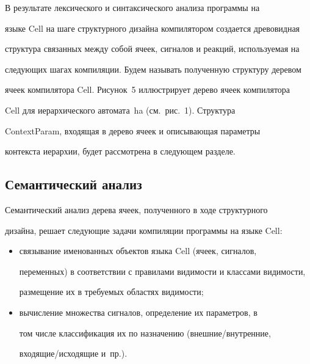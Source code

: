       


      В результате лексического и синтаксического анализа программы на 


языке Cell на шаге структурного дизайна компилятором создается древовидная 


структура связанных между собой ячеек, сигналов и реакций, используемая на 


следующих шагах компиляции. Будем называть полученную структуру деревом 


ячеек компилятора Cell. Рисунок~5 иллюстрирует дерево ячеек компилятора 


Cell для иерархического автомата~ha (см.\ рис.~1). Структура 


ContextParam, входящая в дерево ячеек и описывающая параметры 


контекста иерархии, будет рассмотрена в следующем разделе.





      


\subsection{Семантический анализ}





      Семантический анализ дерева ячеек, полученного в ходе структурного 


дизайна, решает следующие задачи компиляции программы на языке Cell:


      \begin{itemize}


      \item связывание именованных объектов языка Cell (ячеек, сигналов, 


переменных) в соответствии с правилами видимости и классами видимости, 


размещение их в требуемых областях видимости;


      \item вычисление множества сигналов, определение их параметров, в 


том чис\-ле классификация их по назначению (внешние/внутренние, 


входящие/исходящие и~пр.).


      \end{itemize}


      


